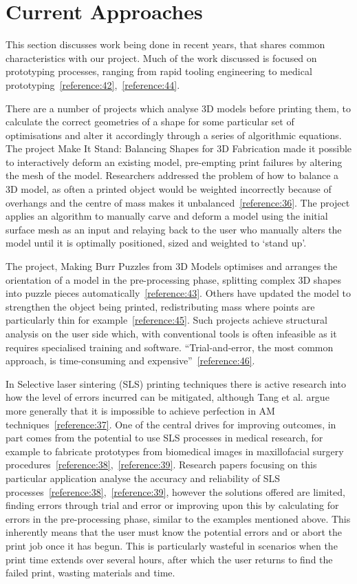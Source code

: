 \documentclass[11pt]{report} %
\begin{document}
\section{Current Approaches}
This section discusses work being done in recent years, that shares common characteristics with our project. Much of the work discussed is focused on prototyping processes, ranging from rapid tooling engineering to medical prototyping~\ref{reference:42},~\ref{reference:44}. 

There are a number of projects which analyse 3D models before printing them, to calculate the correct geometries of a shape for some particular set of optimisations and alter it accordingly through a series of algorithmic equations. The project Make It Stand: Balancing Shapes for 3D Fabrication made it possible to interactively deform an existing model, pre-empting print failures by altering the mesh of the model. Researchers addressed the problem of how to balance a 3D model, as often a printed object would be weighted incorrectly because of overhangs and the centre of mass makes it unbalanced~\ref{reference:36}. The project applies an algorithm to manually carve and deform a model using the initial surface mesh as an input and relaying back to the user who manually alters the model until it is optimally positioned, sized and weighted to `stand up'. 

The project, Making Burr Puzzles from 3D Models optimises and arranges the orientation of a model in the pre-processing phase, splitting complex 3D shapes into puzzle pieces automatically~\ref{reference:43}. Others have updated the model to strengthen the object being printed, redistributing mass where points are particularly thin for example~\ref{reference:45}. Such projects achieve structural analysis on the user side which, with conventional tools is often infeasible as it requires specialised training and software. ``Trial-and-error, the most common approach, is time-consuming and expensive''~\ref{reference:46}. 

In Selective laser sintering (SLS) printing techniques there is active research into how the level of errors incurred can be mitigated, although Tang et al. argue more generally that it is impossible to achieve perfection in AM techniques~\ref{reference:37}. One of the central drives for improving outcomes, in part comes from the potential to use SLS processes in medical research, for example to fabricate prototypes from biomedical images in maxillofacial surgery procedures~\ref{reference:38},~\ref{reference:39}. Research papers focusing on this particular application analyse the accuracy and reliability of SLS processes~\ref{reference:38},~\ref{reference:39}, however the solutions offered are limited, finding errors through trial and error or improving upon this by calculating for errors in the pre-processing phase, similar to the examples mentioned above. This inherently means that the user must know the potential errors and or abort the print job once it has begun. This is particularly wasteful in scenarios when the print time extends over several hours, after which the user returns to find the failed print, wasting materials and time. 
\end{document}

